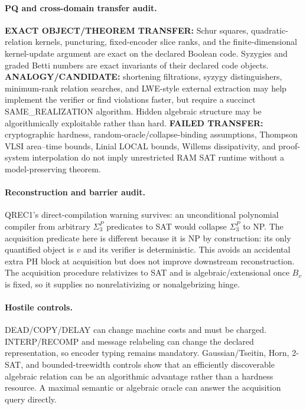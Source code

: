 \documentclass[11pt]{article}
\begin{document}
\paragraph{PQ and cross-domain transfer audit.} \textbf{EXACT OBJECT/THEOREM TRANSFER:} Schur squares, quadratic-relation kernels, puncturing, fixed-encoder slice ranks, and the finite-dimensional kernel-update argument are exact on the declared Boolean code. Syzygies and graded Betti numbers are exact invariants of their declared code objects. \textbf{ANALOGY/CANDIDATE:} shortening filtrations, syzygy distinguishers, minimum-rank relation searches, and LWE-style external extraction may help implement the verifier or find violations faster, but require a succinct SAME\_REALIZATION algorithm. Hidden algebraic structure may be algorithmically exploitable rather than hard. \textbf{FAILED TRANSFER:} cryptographic hardness, random-oracle/collapse-binding assumptions, Thompson VLSI area--time bounds, Linial LOCAL bounds, Willems dissipativity, and proof-system interpolation do not imply unrestricted RAM SAT runtime without a model-preserving theorem.

\paragraph{Reconstruction and barrier audit.} QREC1's direct-compilation warning survives: an unconditional polynomial compiler from arbitrary $\Sigma_3^P$ predicates to SAT would collapse $\Sigma_3^P$ to NP. The acquisition predicate here is different because it is NP by construction: its only quantified object is $v$ and its verifier is deterministic. This avoids an accidental extra PH block at acquisition but does not improve downstream reconstruction. The acquisition procedure relativizes to SAT and is algebraic/extensional once $B_v$ is fixed, so it supplies no nonrelativizing or nonalgebrizing hinge.

\paragraph{Hostile controls.} DEAD/COPY/DELAY can change machine costs and must be charged. INTERP/RECOMP and message relabeling can change the declared representation, so encoder typing remains mandatory. Gaussian/Tseitin, Horn, 2-SAT, and bounded-treewidth controls show that an efficiently discoverable algebraic relation can be an algorithmic advantage rather than a hardness resource. A maximal semantic or algebraic oracle can answer the acquisition query directly.
\end{document}
